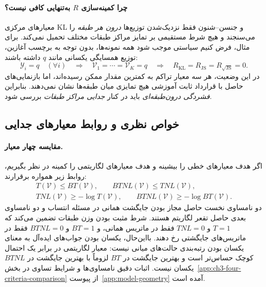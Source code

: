 \paragraph{چرا کمینه‌سازی $R$ به‌تنهایی کافی نیست؟}
معیارهای مرکزی KL و جنسن--شنون فقط نزدیک‌شدن توزیع‌ها \emph{درون هر طبقه} را می‌سنجند و هیچ شرط مستقیمی بر تمایز مراکز طبقات مختلف تحمیل نمی‌کند. برای مثال، فرض کنیم سیاستی موجب شود همه نمونه‌ها، بدون توجه به برچسب آغازین، توزیع همسایگی یکسانی مانند $q$ داشته باشند:
\begin{equation}\label{cmp:eq:ch3-R-collapse}
\mathscr Y_i=q\quad(\forall i)
\quad\Longrightarrow\quad
\mathcal V_1=\cdots=\mathcal V_K=q
\quad\Longrightarrow\quad
R_{\mathrm{KL}}=R_{\mathrm{JS}}=R_{\sqrt{\mathrm{JS}}}=0.
\end{equation}
در این وضعیت، هر سه معیار تراکم به کمترین مقدار ممکن رسیده‌اند، اما بازنمایی‌های حاصل با قرارداد ثابت آموزشی هیچ تمایزی میان طبقه‌ها نشان نمی‌دهند. بنابراین \emph{فشردگی درون‌طبقه‌ای} باید در کنار \emph{جدایی مراکز طبقات} بررسی شود. 

\subsection{خواص نظری و روابط معیارهای جدایی}
\paragraph{مقایسه چهار معیار.}
اگر هدف معیارهای خطی را بیشینه و هدف معیارهای لگاریتمی را کمینه در نظر بگیریم، روابط زیر همواره برقرارند:
\begin{equation}\label{cmp:eq:ch3-four-criteria-comparison}
\boxed{
\begin{gathered}
T(\mathcal V)\le BT(\mathcal V),\qquad
BTNL(\mathcal V)\le TNL(\mathcal V),\\
TNL(\mathcal V)\ge-\log T(\mathcal V),\qquad
BTNL(\mathcal V)\ge-\log BT(\mathcal V).
\end{gathered}}
\end{equation}
دو نامساوی نخست حاصل مجاز بودن جایگشت همانی در مسئله انتساب و دو نامساوی بعدی حاصل تقعر لگاریتم هستند. شرط مثبت بودن وزن طبقات تضمین می‌کند که $T=1$ و $TNL=0$ فقط در ماتریس همانی، و $BT=1$ و $BTNL=0$ فقط در ماتریس‌های جایگشتی رخ دهند. بااین‌حال، یکسان بودن جواب‌های ایده‌آل به معنای یکسان بودن رتبه‌بندی حالت‌های میانی نیست: معیار لگاریتمی در برابر یک احتمال کوچک حساس‌تر است و بهترین جایگشت در $BT$ لزوماً با بهترین جایگشت در $BTNL$ یکسان نیست. اثبات دقیق نامساوی‌ها و شرایط تساوی در بخش~\ref{app:ch3-four-criteria-comparison} از پیوست~\ref{app:model-geometry} آمده است.


